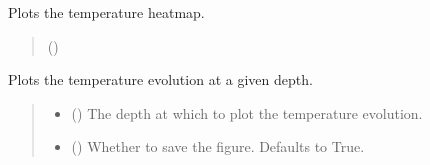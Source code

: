 \documentclass[a4paper,11pt,english,openany]{sphinxmanual}
\begin{document}
\begin{fulllineitems}
\begin{fulllineitems}
\label{\detokenize{api/spyice.postprocess.visualise_model:src.spyice.postprocess.visualise_model.VisualiseModel.plot_salinity_heatmap}}
\pysigstartsignatures
\pysiglinewithargsret
{}
{}
{}
\pysigstopsignatures
\sphinxAtStartPar
Plots the temperature heatmap.
\begin{quote}\begin{description}
\sphinxAtStartPar
{} ()

\end{description}\end{quote}

\end{fulllineitems}


\begin{fulllineitems}
\label{\detokenize{api/spyice.postprocess.visualise_model:src.spyice.postprocess.visualise_model.VisualiseModel.plot_temperature}}
\pysigstartsignatures
\pysiglinewithargsret
{}
{\sphinxparamcomma {}\sphinxparamcomma {}}
{}
\pysigstopsignatures
\sphinxAtStartPar
Plots the temperature evolution at a given depth.
\begin{quote}\begin{description}
\begin{itemize}
\item {} 
\sphinxAtStartPar
{} () \textendash{} The depth at which to plot the temperature evolution.

\item {} 
\sphinxAtStartPar
{} (\sphinxstyleliteralemphasis{\sphinxupquote{, }}) \textendash{} Whether to save the figure. Defaults to True.


\end{itemize}
\end{description}
\end{quote}
\end{fulllineitems}
\end{fulllineitems}
\end{document}
